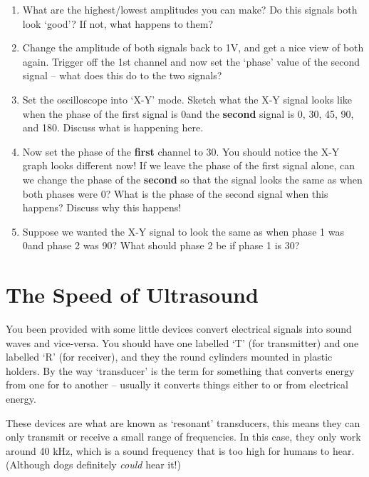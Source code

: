 \documentclass[12pt, letterpaper]{article}
\begin{document}
\begin{enumerate}
	\item What are the highest/lowest amplitudes you can make? 
	Do this signals both look `good'?
	If not, what happens to them?
	
	\answergrid{4cm}
	\item Change the amplitude of both signals back to 1V, and get a nice view of both again.  
	Trigger off the 1st channel and now set the `phase' value of the second signal -- what does this do to the two signals?

	\answergrid{3cm}\clearpage
	\item Set the oscilloscope into `X-Y' mode.  Sketch what the X-Y signal looks like when the phase of the first signal is 0\deg and the \textbf{second} signal is 0\deg, 30\deg, 45\deg, 90\deg, and 180\deg.  	Discuss what is happening here.
	
	\fillanswergrid
	
	\item Now set the phase of the \textbf{first} channel to  30\deg.  You should notice the X-Y graph looks different now!  If we leave the phase of the first signal alone, can we change the phase of the \textbf{second} so that the signal looks the same as when both phases were 0\deg?  What is the phase of the second signal when this happens?  Discuss why this happens!
	
	\answergrid{3cm}
	\item
	Suppose we wanted the X-Y signal to look the same as when phase 1 was 0\deg and phase 2 was 90\deg?  What should phase 2 be if phase 1 is 30\deg?
	
	\answergrid{3cm}
\end{enumerate}

\section{The Speed of Ultrasound}

You been provided with some little devices convert electrical signals into sound waves and vice-versa.  You should have one labelled `T' (for transmitter) and one labelled `R' (for receiver), and they the round cylinders mounted in plastic holders.
By the way `transducer' is the term for something that converts energy from one for to another -- usually it converts things either to or from electrical energy.

These devices are what are known as `resonant' transducers, this means they can only transmit or receive a small range of frequencies.  
In this case, they only work around 40 kHz, which is a sound frequency that is too high for humans to hear.
(Although dogs definitely \emph{could} hear it!)
\end{document}
